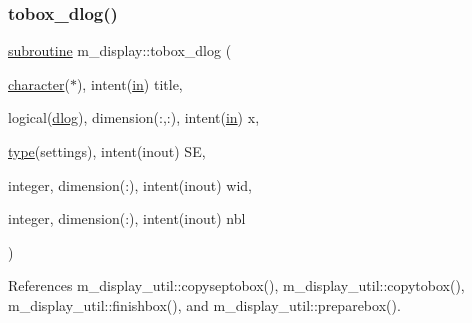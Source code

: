 \subsubsection{\texorpdfstring{tobox\+\_\+dlog()}{tobox\_dlog()}}
{\footnotesize\ttfamily \hyperlink{M__stopwatch_83_8txt_acfbcff50169d691ff02d4a123ed70482}{subroutine} m\+\_\+display\+::tobox\+\_\+dlog (\begin{DoxyParamCaption}\item[{\hyperlink{option__stopwatch_83_8txt_abd4b21fbbd175834027b5224bfe97e66}{character}($\ast$), intent(\hyperlink{M__journal_83_8txt_afce72651d1eed785a2132bee863b2f38}{in})}]{title,  }\item[{logical(\hyperlink{namespacem__display_a8c6a3df510feabf6bc84dd0a8789f98c}{dlog}), dimension(\+:,\+:), intent(\hyperlink{M__journal_83_8txt_afce72651d1eed785a2132bee863b2f38}{in})}]{x,  }\item[{\hyperlink{stop__watch_83_8txt_a70f0ead91c32e25323c03265aa302c1c}{type}(settings), intent(inout)}]{SE,  }\item[{integer, dimension(\+:), intent(inout)}]{wid,  }\item[{integer, dimension(\+:), intent(inout)}]{nbl }\end{DoxyParamCaption})\hspace{0.3cm}{\ttfamily [private]}}



References m\+\_\+display\+\_\+util\+::copyseptobox(), m\+\_\+display\+\_\+util\+::copytobox(), m\+\_\+display\+\_\+util\+::finishbox(), and m\+\_\+display\+\_\+util\+::preparebox().

\mbox{\label{namespacem__display_a880ae5ed1f32412fadb1d1b91d406218}} 
